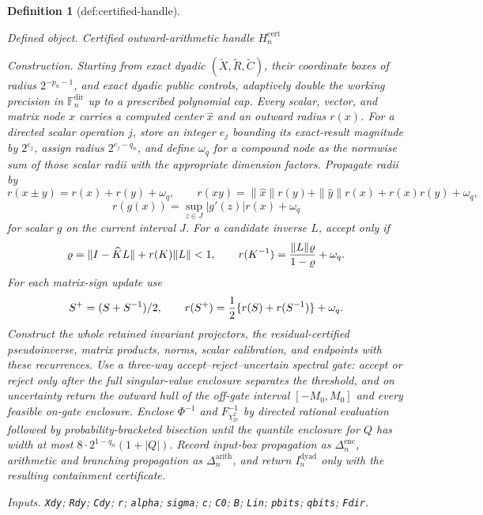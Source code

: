 \documentclass{article}
\newtheorem{definition}{Definition}
\begin{document}
\begin{definition}[def:certified-handle]\label{def:certified-handle}
\par\smallskip\noindent\emph{Defined object.} Certified outward-arithmetic handle \(H_n^{\mathrm{cert}}\)
\par\smallskip\noindent\emph{Construction.} Starting from exact dyadic \((\widetilde X,\widetilde R,\widetilde C)\), their coordinate boxes of radius \(2^{-p_n-1}\), and exact dyadic public controls, adaptively double the working precision in \(\mathbb F_n^{\mathrm{dir}}\) up to a prescribed polynomial cap.  Every scalar, vector, and matrix node \(x\) carries a computed center \(\widehat x\) and an outward radius \(r(x)\).  For a directed scalar operation \(j\), store an integer \(e_j\) bounding its exact-result magnitude by \(2^{e_j}\), assign radius \(2^{e_j-q_n}\), and define \(\omega_q\) for a compound node as the normwise sum of those scalar radii with the appropriate dimension factors.  Propagate radii by
\[
r(x\mathbin\pm y)=r(x)+r(y)+\omega_q,
\qquad
r(xy)=\|\widehat x\|r(y)+\|\widehat y\|r(x)+r(x)r(y)+\omega_q,
\]
\[
r(g(x))=\sup_{z\in J}|g'(z)|r(x)+\omega_q
\]
for scalar \(g\) on the current interval \(J\).  For a candidate inverse \(L\), accept only if
\[
\varrho=\|I-\widehat K L\|+r(K)\|L\|<1,
\qquad
r(K^{-1})={\|L\|\varrho\over1-\varrho}+\omega_q.
\]
For each matrix-sign update use
\[
S^+=(S+S^{-1})/2,
\qquad
r(S^+)={1\over2}\{r(S)+r(S^{-1})\}+\omega_q.
\]
Construct the whole retained invariant projectors, the residual-certified pseudoinverse, matrix products, norms, scalar calibration, and endpoints with these recurrences.  Use a three-way accept--reject--uncertain spectral gate: accept or reject only after the full singular-value enclosure separates the threshold, and on uncertainty return the outward hull of the off-gate interval \([-M_0,M_0]\) and every feasible on-gate enclosure.  Enclose \(\Phi^{-1}\) and \(F_{\chi^2_{2r}}^{-1}\) by directed rational evaluation followed by probability-bracketed bisection until the quantile enclosure for \(Q\) has width at most \(8\cdot2^{1-q_n}(1+|Q|)\).  Record input-box propagation as \(\Delta_n^{\mathrm{enc}}\), arithmetic and branching propagation as \(\Delta_n^{\mathrm{arith}}\), and return \(I_n^{\mathrm{dyad}}\) only with the resulting containment certificate.
\par\smallskip\noindent\emph{Inputs.} \texttt{Xdy}; \texttt{Rdy}; \texttt{Cdy}; \texttt{r}; \texttt{alpha}; \texttt{sigma}; \texttt{c}; \texttt{C0}; \texttt{B}; \texttt{Lin}; \texttt{pbits}; \texttt{qbits}; \texttt{Fdir}.
\end{definition}
\end{document}
